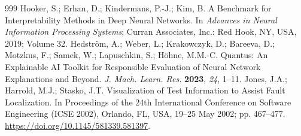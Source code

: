 \documentclass[drones,article,submit,moreauthors]{Definitions/mdpi}
\begin{document}
\begin{thebibliography}{999}
 Hooker, S.; Erhan, D.; Kindermans, P.-J.; Kim, B. A Benchmark for Interpretability Methods in Deep Neural Networks. In \textit{Advances in Neural Information Processing Systems}; Curran Associates, Inc.: Red Hook, NY, USA, 2019; Volume 32.
 Hedstr{\"o}m, A.; Weber, L.; Krakowczyk, D.; Bareeva, D.; Motzkus, F.; Samek, W.; Lapuschkin, S.; H{\"o}hne, M.M.-C. Quantus: An Explainable AI Toolkit for Responsible Evaluation of Neural Network Explanations and Beyond. \textit{J. Mach. Learn. Res.} \textbf{2023}, \textit{24}, 1--11.
 Jones, J.A.; Harrold, M.J.; Stasko, J.T. Visualization of Test Information to Assist Fault Localization. In Proceedings of the 24th International Conference on Software Engineering (ICSE 2002), Orlando, FL, USA, 19--25 May 2002; pp. 467--477. \href{https://doi.org/10.1145/581339.581397}{https://doi.org/10.1145/581339.581397}.
\end{thebibliography}
\end{document}
